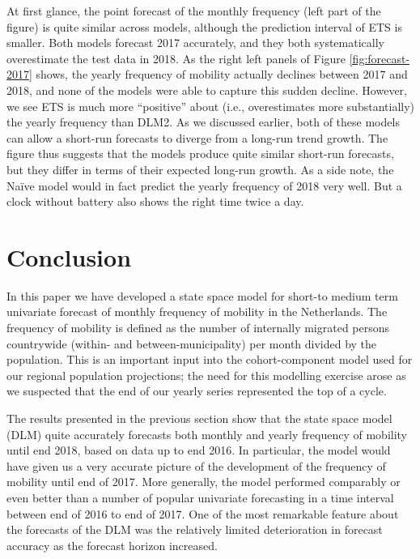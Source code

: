 \documentclass[]{article}
\begin{document}
At first glance, the point forecast of the monthly frequency (left part
of the figure) is quite similar across models, although the prediction
interval of ETS is smaller. Both models forecast 2017 accurately, and
they both systematically overestimate the test data in 2018. As the
right left panels of Figure \ref{fig:forecast-2017} shows, the yearly
frequency of mobility actually declines between 2017 and 2018, and none
of the models were able to capture this sudden decline. However, we see
ETS is much more ``positive'' about (i.e., overestimates more
substantially) the yearly frequency than DLM2. As we discussed earlier,
both of these models can allow a short-run forecasts to diverge from a
long-run trend growth. The figure thus suggests that the models produce
quite similar short-run forecasts, but they differ in terms of their
expected long-run growth. As a side note, the Naïve model would in fact
predict the yearly frequency of 2018 very well. But a clock without
battery also shows the right time twice a day.

\section{Conclusion}\label{conclusion}

In this paper we have developed a state space model for short-to medium
term univariate forecast of monthly frequency of mobility in the
Netherlands. The frequency of mobility is defined as the number of
internally migrated persons countrywide (within- and
between-municipality) per month divided by the population. This is an
important input into the cohort-component model used for our regional
population projections; the need for this modelling exercise arose as we
suspected that the end of our yearly series represented the top of a
cycle.

The results presented in the previous section show that the state space
model (DLM) quite accurately forecasts both monthly and yearly frequency
of mobility until end 2018, based on data up to end 2016. In particular,
the model would have given us a very accurate picture of the development
of the frequency of mobility until end of 2017. More generally, the
model performed comparably or even better than a number of popular
univariate forecasting in a time interval between end of 2016 to end of
2017. One of the most remarkable feature about the forecasts of the DLM
was the relatively limited deterioration in forecast accuracy as the
forecast horizon increased.
\end{document}
